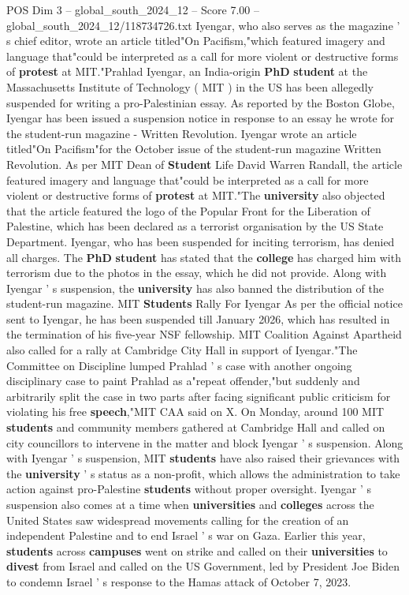 \begin{textsample}{POS Dim 3 – global\_south\_2024\_12 – Score 7.00 – global\_south\_2024\_12/118734726.txt}  \label{ex:f3_pos_392}
Iyengar, who also serves as the magazine ' s chief editor, wrote an article titled"On Pacifism,"which featured imagery and language that"could be interpreted as a call for more violent or destructive forms of \textbf{protest} at MIT."Prahlad Iyengar, an India-origin \textbf{PhD} \textbf{student} at the Massachusetts Institute of Technology ( MIT ) in the US has been allegedly suspended for writing a pro-Palestinian essay.
As reported by the Boston Globe, Iyengar has been issued a suspension notice in response to an essay he wrote for the student-run magazine - Written Revolution.
Iyengar wrote an article titled"On Pacifism"for the October issue of the student-run magazine Written Revolution.
As per MIT Dean of \textbf{Student} Life David Warren Randall, the article featured imagery and language that"could be interpreted as a call for more violent or destructive forms of \textbf{protest} at MIT."The \textbf{university} also objected that the article featured the logo of the Popular Front for the Liberation of Palestine, which has been declared as a terrorist organisation by the US State Department.
Iyengar, who has been suspended for inciting terrorism, has denied all charges.
The \textbf{PhD} \textbf{student} has stated that the \textbf{college} has charged him with terrorism due to the photos in the essay, which he did not provide.
Along with Iyengar ' s suspension, the \textbf{university} has also banned the distribution of the student-run magazine.
MIT \textbf{Students} Rally For Iyengar As per the official notice sent to Iyengar, he has been suspended till January 2026, which has resulted in the termination of his five-year NSF fellowship.
MIT Coalition Against Apartheid also called for a rally at Cambridge City Hall in support of Iyengar."The Committee on Discipline lumped Prahlad ' s case with another ongoing disciplinary case to paint Prahlad as a"repeat offender,"but suddenly and arbitrarily split the case in two parts after facing significant public criticism for violating his free \textbf{speech},"MIT CAA said on X.
On Monday, around 100 MIT \textbf{students} and community members gathered at Cambridge Hall and called on city councillors to intervene in the matter and block Iyengar ' s suspension.
Along with Iyengar ' s suspension, MIT \textbf{students} have also raised their grievances with the \textbf{university} ' s status as a non-profit, which allows the administration to take action against pro-Palestine \textbf{students} without proper oversight.
Iyengar ' s suspension also comes at a time when \textbf{universities} and \textbf{colleges} across the United States saw widespread movements calling for the creation of an independent Palestine and to end Israel ' s war on Gaza.
Earlier this year, \textbf{students} across \textbf{campuses} went on strike and called on their \textbf{universities} to \textbf{divest} from Israel and called on the US Government, led by President Joe Biden to condemn Israel ' s response to the Hamas attack of October 7, 2023.

\end{textsample}
